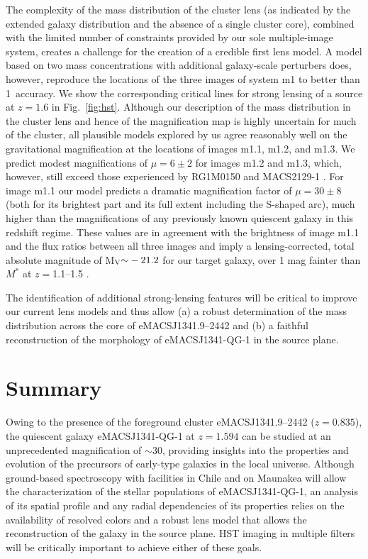 \documentclass[twocolumn,times]{aastex61}
\begin{document}
The complexity of the mass distribution of the cluster lens (as indicated by the extended galaxy distribution and the absence of a single cluster core), combined with the limited number of constraints provided by our sole multiple-image system, creates a challenge for the creation of a credible first lens model. A model based on two mass concentrations with additional galaxy-scale perturbers does, however, reproduce the locations of the three images of system m1 to better than 1\arcsec\ accuracy. We show the corresponding critical lines for strong lensing of a source at $z=1.6$ in Fig.~\ref{fig:hst}. Although our description of the mass distribution in the cluster lens and hence of the magnification map is highly uncertain for much of the cluster, all plausible models explored by us agree reasonably well on the gravitational magnification at the locations of images m1.1, m1.2, and m1.3. We predict modest magnifications of $\mu=6\pm 2$ for images m1.2 and m1.3, which, however, still exceed those experienced by RG1M0150 \citep{Newman2015} and MACS2129-1 \citep{Toft2017}. For image m1.1 our model predicts a dramatic magnification factor of $\mu=30\pm 8$ (both for its brightest part and its full extent including the S-shaped arc), much higher than the magnifications of any previously known quiescent galaxy in this redshift regime. These values are in agreement with the brightness of image m1.1 and the flux ratios between all three images and
imply a lensing-corrected, total absolute magnitude of M$_{\rm V}{\sim}-21.2$ for our target galaxy, over 1 mag fainter than $M^\ast$ at $z{=}$1.1--1.5 \citep{Marchesini2012}. 

The identification of additional strong-lensing features will be critical to improve our current lens models and thus allow (a) a robust determination of the mass distribution across the core of eMACSJ1341.9--2442 and (b) a faithful reconstruction of the morphology of eMACSJ1341-QG-1 in the source plane.

\section{Summary}

Owing to the presence of the foreground cluster eMACSJ1341.9--2442 ($z=0.835$), the  quiescent galaxy eMACSJ1341-QG-1 at $z=1.594$ can be studied at an unprecedented magnification of $\sim$30, providing insights into the properties and evolution of the precursors of early-type galaxies in the local universe. Although ground-based spectroscopy with facilities in Chile and on Maunakea will allow the characterization of the stellar populations of eMACSJ1341-QG-1, an analysis of its spatial profile and any radial dependencies of its properties relies on the availability of resolved colors and a robust lens model that allows the reconstruction of the galaxy in the source plane. HST imaging in multiple filters will be critically important to achieve either of these goals.
\end{document}
